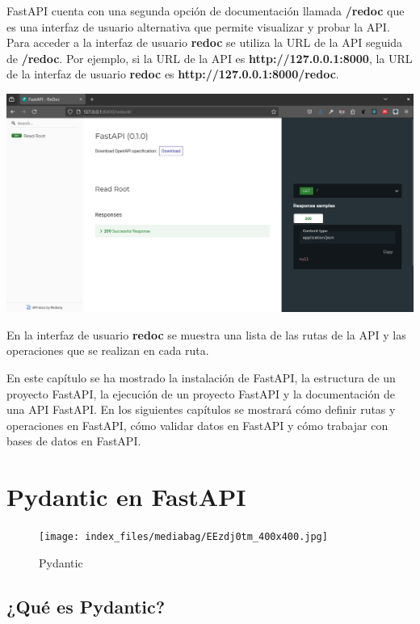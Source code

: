 \documentclass[
  a4paper,
  DIV=11,
  numbers=noendperiod,
  onepage,
  openany]{scrreprt}
\begin{document}
FastAPI cuenta con una segunda opción de documentación llamada
\textbf{/redoc} que es una interfaz de usuario alternativa que permite
visualizar y probar la API. Para acceder a la interfaz de usuario
\textbf{redoc} se utiliza la URL de la API seguida de \textbf{/redoc}.
Por ejemplo, si la URL de la API es \textbf{http://127.0.0.1:8000}, la
URL de la interfaz de usuario \textbf{redoc} es
\textbf{http://127.0.0.1:8000/redoc}.

\includegraphics{unidades/unidad5/images/paste-19.png}

En la interfaz de usuario \textbf{redoc} se muestra una lista de las
rutas de la API y las operaciones que se realizan en cada ruta.

En este capítulo se ha mostrado la instalación de FastAPI, la estructura
de un proyecto FastAPI, la ejecución de un proyecto FastAPI y la
documentación de una API FastAPI. En los siguientes capítulos se
mostrará cómo definir rutas y operaciones en FastAPI, cómo validar datos
en FastAPI y cómo trabajar con bases de datos en FastAPI.

\chapter{Pydantic en FastAPI}\label{pydantic-en-fastapi}

\begin{figure}[H]

{\centering \texttt{[image: index\_files/mediabag/EEzdj0tm\_400x400.jpg]}

}

\caption{Pydantic}

\end{figure}%

\section{¿Qué es Pydantic?}\label{quuxe9-es-pydantic}
\end{document}

